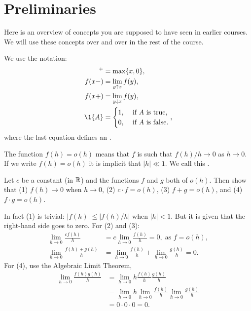 \section{Preliminaries}
\label{sec:preliminaries}




Here is an overview of concepts you are supposed to have seen in earlier courses.
We will use these concepts over and over in the rest of the course.


We use the notation:
  \begin{align*}
  [x]^+ &= \max\{x, 0\}, \\
  f(x-) &= \lim_{y\uparrow x} f(y),\\
  f(x+) &= \lim_{y\downarrow x} f(y),\\
    \1{A} &=
            \begin{cases}
              1, & \text{ if $A$ is true}, \\
              0, & \text{ if $A$ is false}.
            \end{cases}, 
\end{align*}
where the last equation defines an .


The function $f(h)=o(h)$ means that $f$ is such that $f(h)/h \to 0$ as $h\to 0$.
If we write $f(h) = o(h)$ it is implicit that $|h| \ll 1$.
We call this .
\begin{exercise}
  Let $c$ be a constant (in $\mathbb{R}$) and the functions $f$ and $g$ both of $o(h)$. Then show that (1) $f(h) \to 0$ when $h\to 0$, (2) $c\cdot f = o(h)$, (3) $f+g=o(h)$, and (4) $f\cdot g=o(h)$. 
\begin{solution}
     In fact (1) is trivial: $|f(h)| \leq |f(h)/h|$ when $|h| < 1$.
     But it is given that the right-hand side goes to zero.
     For (2) and (3):
\begin{align*}
\lim_{h\to 0} \frac{c f(h)}{h} &=  c \lim_{h\to 0} \frac{f(h)}{h} = 0, \; \text{as } f = o(h), \\
\lim_{h\to 0} \frac{f(h) + g(h)} h &= \lim_{h\to 0} \frac{f(h)} h + \lim_{h\to 0} \frac{g(h)} h = 0.
\end{align*}
For (4), use  the Algebraic Limit Theorem,
\begin{align*}
\lim_{h\to 0} \frac{f(h)g(h)}{h} &= \lim_{h\to 0} h \frac{f(h)}{h} \frac{g(h)}{h} \\
&= \lim_{h\to 0} h \lim_{h\to 0} \frac{f(h)}{h} \lim_{h\to 0} \frac{g(h)}{h} \\
&= 0 \cdot 0 \cdot 0 = 0.
\end{align*}
\end{solution}
\end{exercise}



